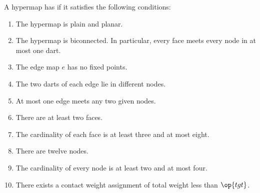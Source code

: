 \begin{definition}
  A hypermap has  if it satisfies the following 
  conditions:
%
%
%
%
%
%
%
%
%
\begin{enumerate}
\item {} The hypermap is plain and planar.
\item {} The hypermap is biconnected.  In particular,
  every face meets every node in at most one dart.
\item {} The edge map $e$ has no fixed points.
\item {} The two darts of each edge lie in different
  nodes.
\item {} At most one edge meets any two given
  nodes.
\item {} There are at least two faces.
\item {} The cardinality of each face is at least three
  and at most eight.
\item {} There are twelve nodes.
\item {} The cardinality of every node is at least two  and at most four.
\item {} There exists a contact weight assignment of total
  weight less than $\op{tgt}$.
\end{enumerate}
%
\end{definition}


